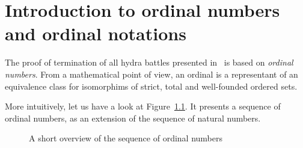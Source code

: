 \chapter{Introduction to ordinal numbers and ordinal notations}


The proof of termination of all hydra battles presented in~\cite{KP82} is based
on \emph{ordinal numbers}.
From a mathematical point of view, an ordinal is a representant of an equivalence class for isomorphims of strict, total and well-founded ordered sets.

More intuitively, let us have a look at Figure~\ref{fig:ordinal-sequence}. It presents a sequence of ordinal numbers, as an extension of the sequence of natural numbers. 




\begin{figure}[h]
  \centering
{}
 
 
  \caption{A short overview of the sequence of ordinal numbers}
  \label{fig:ordinal-sequence}
\end{figure}


